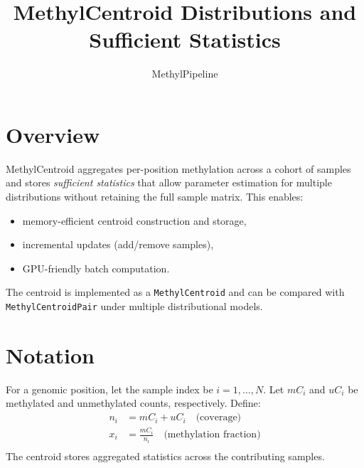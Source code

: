\documentclass[11pt]{article}
\title{MethylCentroid Distributions and Sufficient Statistics}
\author{MethylPipeline}
\date{}
\begin{document}
\maketitle

\section{Overview}
MethylCentroid aggregates per-position methylation across a cohort of samples and
stores \emph{sufficient statistics} that allow parameter estimation for multiple
distributions without retaining the full sample matrix. This enables:
\begin{itemize}
  \item memory-efficient centroid construction and storage,
  \item incremental updates (add/remove samples),
  \item GPU-friendly batch computation.
\end{itemize}

The centroid is implemented as a \texttt{MethylCentroid} and can be
compared with \texttt{MethylCentroidPair} under multiple distributional models.

\section{Notation}
For a genomic position, let the sample index be $i = 1,\ldots,N$.
Let $mC_i$ and $uC_i$ be methylated and unmethylated counts, respectively.
Define:
\begin{align*}
  n_i &= mC_i + uC_i \quad \text{(coverage)} \\
  x_i &= \frac{mC_i}{n_i} \quad \text{(methylation fraction)} \\
\end{align*}
The centroid stores aggregated statistics across the contributing samples.
\end{document}
